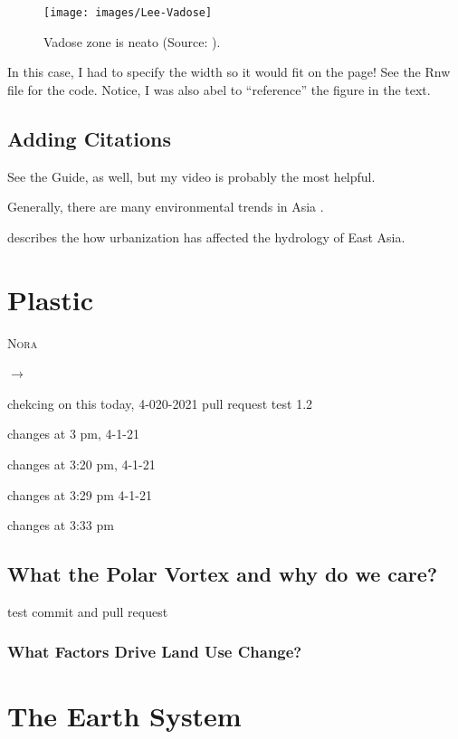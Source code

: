 \documentclass{book}\usepackage{knitr}
\makeatletter
\newcommand{\chapterauthor}[1]{%
  {\parindent0pt\vspace*{-25pt}%
  \linespread{1.1}\large\scshape#1%
  \par\nobreak\vspace*{35pt}}
  \@afterheading%
}
\makeatother
\begin{document}
\begin{figure}
\texttt{[image: images/Lee-Vadose]}
\caption{Vadose zone is neato (Source: \citet{lee2017fifty}).}
\label{fig:vadose}
\end{figure}

In this case, I had to specify the width so it would fit on the page!  See the Rnw file for the code. Notice, I was also abel to ``reference'' the figure in the text.

\section{Adding Citations}

See the Guide, as well, but my video is probably the most helpful.


Generally, there are many environmental trends in Asia \citep{imura2005urban}.

\citet{imura2005urban} describes the how urbanization has affected the hydrology of East Asia. 
 

\chapter{Plastic}

\chapterauthor{Nora}

$\rightarrow$

chekcing on this today, 4-020-2021
pull request test 1.2 

changes at 3 pm, 4-1-21

changes at 3:20 pm, 4-1-21

changes at 3:29 pm 4-1-21

changes at 3:33 pm

\section{What the Polar Vortex and why do we care?}

test commit and pull request 


\subsection{What Factors Drive Land Use Change?}





\mainmatter


\chapter{The Earth System}\label{earthsystem}
\end{document}
